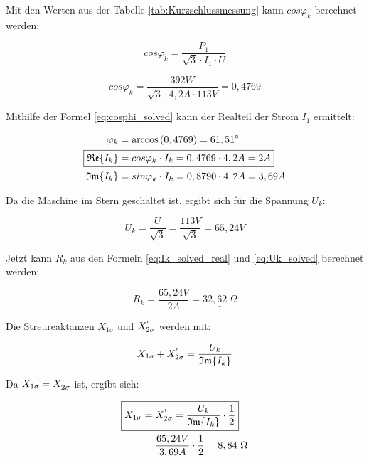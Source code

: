\documentclass[conference]{IEEEtran}
\begin{document}
Mit den Werten aus der Tabelle \ref{tab:Kurzschlussmessung} kann $cos\varphi_k$ berechnet werden:

\begin{equation}
    \boxed{cos\varphi_k = \frac{P_1}{\sqrt{3} \cdot I_1 \cdot U}}
\end{equation}

\begin{equation} \label{eq:cosphi_solved}
    cos\varphi_k = \frac{392 W}{\sqrt{3} \cdot 4,2 A \cdot 113 V} = 0,4769
\end{equation}

Mithilfe der Formel \ref{eq:cosphi_solved} kann der Realteil der Strom $I_1$ ermittelt:

\begin{align} \label{eq:Ik_solved_real}
    \varphi_k                    & = \arccos\left(0,4769\right) = 61,51^\circ             \\
    \Aboxed{\mathfrak{Re}\{I_k\} & = cos\varphi_k \cdot I_k = 0,4769 \cdot 4,2 A = 2A}    \\
    \mathfrak{Im}\{I_k\}         & = sin\varphi_k \cdot I_k = 0,8790 \cdot 4,2 A = 3,69 A
\end{align}

Da die Maschine im Stern geschaltet ist, ergibt sich für die Spannung $U_k$:

\begin{equation} \label{eq:Uk_solved}
    \boxed{U_k = \frac{U}{\sqrt{3}}} = \frac{113 V}{\sqrt{3}} = 65,24 V
\end{equation}

Jetzt kann $R_k$ aus den Formeln \ref{eq:Ik_solved_real} und \ref{eq:Uk_solved} berechnet werden:

\begin{equation} \label{eq:Kurzschlusswiderstand_calc}
    \boxed{R_k = \frac{65,24V}{2A} = \underline{32,62\ \Omega}}
\end{equation}

Die Streureaktanzen $X_{1\sigma}$ und $X_{2\sigma}^\text{\textquotesingle}$ werden mit:

\begin{equation} \label{eq:Streureaktanzen}
    X_{1\sigma} + X_{2\sigma}^\text{\textquotesingle} = \frac{U_k}{\mathfrak{Im}\{I_k\}}
\end{equation}

Da $X_{1\sigma} = X_{2\sigma}^\text{\textquotesingle}$ ist, ergibt sich:

\begin{align} \label{eq:Streureaktanzen_solved}
    \Aboxed{X_{1\sigma} & = X_{2\sigma}^\text{\textquotesingle} = \frac{U_k}{\mathfrak{Im}\{I_k\}}\cdot\frac{1}{2}} \\
                        & = \frac{65,24V}{3,69A}\cdot\frac{1}{2} = 8,84\ \Omega
\end{align}
\end{document}
